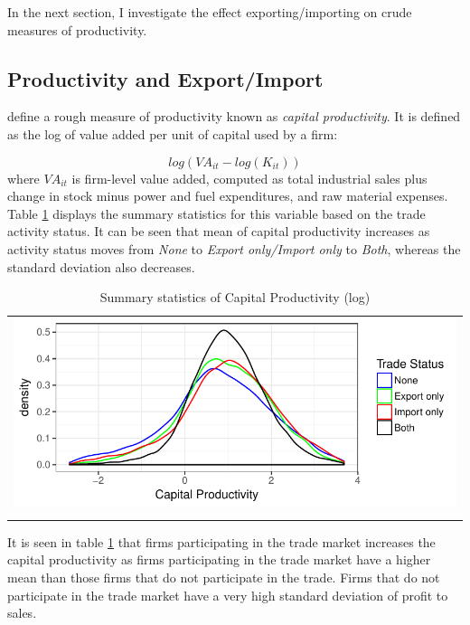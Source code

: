 \documentclass[11pt]{article}
\begin{document}
In the next section, I investigate the effect  exporting/importing on
crude measures of productivity. 
\subsection{Productivity and Export/Import}
\textcite{gupta2018exporting} define a rough measure of productivity known
as \textit{capital productivity}. It is defined as the log of value added per
unit of capital used by a firm:

$$ log(VA_{it} - log(K_{it}))$$
where $VA_{it}$ is firm-level value added, computed as total industrial sales plus
change in stock minus power and fuel expenditures, and raw material
expenses. 
 Table \ref{tab:capprod} displays the summary statistics for this variable
based on the trade activity status. It can be seen that mean of capital
productivity increases as activity status moves from \textit{None} to
\textit{Export only/Import only} to \textit{Both}, whereas the
standard deviation also decreases.  
\begin{center}
\begin{table}[H]
\caption{Summary statistics of Capital Productivity (log)}
\label{tab:capprod}
\begin{tabular}{c}
 \includegraphics{./PICS/denscapprod.pdf}   \\ 
   \\  
\end{tabular}
\end{table}
\end{center}
 It is seen in table \ref{tab:capprod} that firms participating in
the trade market increases the capital productivity  as firms
participating in the trade market have a higher mean than those firms
that do not participate in the trade. Firms that do
not participate in the trade market have a very high standard
deviation of profit to sales.
\end{document}
